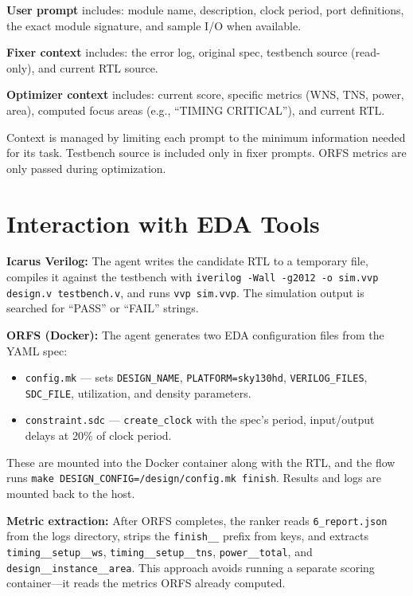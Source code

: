 \documentclass[10pt]{article}
\begin{document}
\textbf{User prompt} includes: module name, description, clock period, port definitions, the exact module signature, and sample I/O when available.

\textbf{Fixer context} includes: the error log, original spec, testbench source (read-only), and current RTL source.

\textbf{Optimizer context} includes: current score, specific metrics (WNS, TNS, power, area), computed focus areas (e.g., ``TIMING CRITICAL''), and current RTL.

Context is managed by limiting each prompt to the minimum information needed for its task. Testbench source is included only in fixer prompts. ORFS metrics are only passed during optimization.

\section{Interaction with EDA Tools}

\textbf{Icarus Verilog:} The agent writes the candidate RTL to a temporary file, compiles it against the testbench with \texttt{iverilog -Wall -g2012 -o sim.vvp design.v testbench.v}, and runs \texttt{vvp sim.vvp}. The simulation output is searched for ``PASS'' or ``FAIL'' strings.

\textbf{ORFS (Docker):} The agent generates two EDA configuration files from the YAML spec:
\begin{itemize}[topsep=2pt,itemsep=0pt]
  \item \texttt{config.mk} --- sets \texttt{DESIGN\_NAME}, \texttt{PLATFORM=sky130hd}, \texttt{VERILOG\_FILES}, \texttt{SDC\_FILE}, utilization, and density parameters.
  \item \texttt{constraint.sdc} --- \texttt{create\_clock} with the spec's period, input/output delays at 20\% of clock period.
\end{itemize}
These are mounted into the Docker container along with the RTL, and the flow runs \texttt{make DESIGN\_CONFIG=/design/config.mk finish}. Results and logs are mounted back to the host.

\textbf{Metric extraction:} After ORFS completes, the ranker reads \texttt{6\_report.json} from the logs directory, strips the \texttt{finish\_\_} prefix from keys, and extracts \texttt{timing\_\_setup\_\_ws}, \texttt{timing\_\_setup\_\_tns}, \texttt{power\_\_total}, and \texttt{design\_\_instance\_\_area}. This approach avoids running a separate scoring container---it reads the metrics ORFS already computed.
\end{document}

